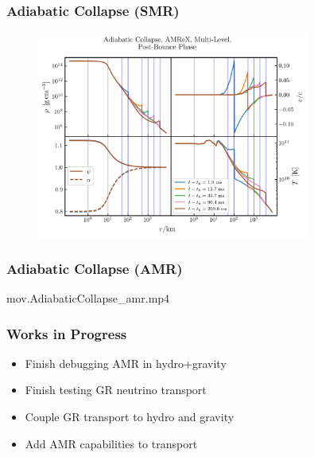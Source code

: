 \documentclass{beamer}
\begin{document}
\begin{frame}
\frametitle{Adiabatic Collapse (SMR)}

  \begin{figure}[htb!]
    \centering
    \includegraphics[width=0.8\textwidth]{fig.PostBounce.png}
  \end{figure}

\end{frame}

\begin{frame}
\frametitle{Adiabatic Collapse (AMR)}

  \begin{center}
    {mov.AdiabaticCollapse_amr.mp4}
  \end{center}

\end{frame}

\begin{frame}
\frametitle{Works in Progress}

  \begin{itemize}
    \vfill\item
      Finish debugging AMR in hydro+gravity
    \vfill\item
      Finish testing GR neutrino transport
    \vfill\item
      Couple GR transport to hydro and gravity
    \vfill\item
      Add AMR capabilities to transport
  \end{itemize}

\end{frame}
\end{document}
